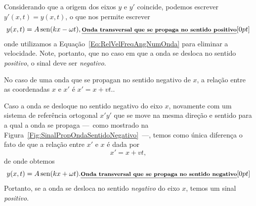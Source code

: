 Considerando que a origem dos eixos $y$ e $y'$ coincide, podemos escrever $y'(x,t) = y(x,t)$, o que nos permite escrever
\begin{equation}
    y(x,t) = A\operatorname{sen}(kx - \omega t), \relax{\footnotesize\emph{\textbf{Onda transversal que se propaga no sentido positivo}}}[0pt]
\end{equation}
%
onde utilizamos a Equação~\ref{Eq:RelVelFreqAngNumOnda} para eliminar a velocidade. Note, portanto, que no caso em que a onda se desloca no sentido \emph{positivo}, o sinal deve ser \emph{negativo}.

\begin{marginfigure}[3cm]
\centering
{}
\caption{No caso de uma onda que se propagan no sentido negativo de $x$, a relação entre as coordenadas $x$ e $x'$ é $x' = x + vt$.\label{Fig:SinalPropOndaSentidoNegativo}.}
\end{marginfigure}

Caso a onda se desloque no sentido negativo do eixo $x$, novamente com um sistema de referência ortogonal $x'y'$ que se move na mesma direção e sentido para a qual a onda se propaga ---~como mostrado na Figura~\ref{Fig:SinalPropOndaSentidoNegativo}~---, temos como única diferença o fato de que a relação entre $x'$ e $x$ é dada por
\begin{equation}
    x' = x + vt,
\end{equation}
%
de onde obtemos
\begin{equation}
    y(x,t) = A\operatorname{sen}(kx + \omega t). \relax{\footnotesize\emph{\textbf{Onda transversal que se propaga no sentido negativo}}}[0pt]
\end{equation}
%
Portanto, se a onda se desloca no sentido \emph{negativo} do eixo $x$, temos um sinal \emph{positivo}.

